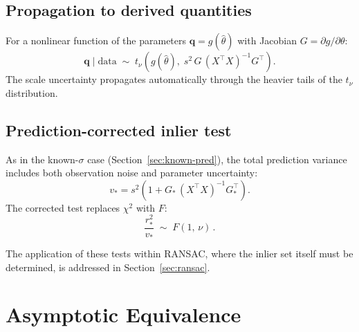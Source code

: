 \documentclass[11pt]{article}
\newcommand{\data}{\mathrm{data}}
\begin{document}
\subsection{Propagation to derived quantities}
\label{sec:unknown-prop}

For a nonlinear function of the parameters
$\mathbf{q} = g(\hat\theta)$ with Jacobian $G = \partial g / \partial \theta$:
\begin{equation}
  \boxed{
    \mathbf{q} \mid \data \;\sim\;
    t_\nu\!\left(g(\hat\theta),\;
      s^2\, G\, (X^\top X)^{-1} G^\top\right).
  }
\end{equation}
The scale uncertainty propagates automatically through the heavier tails of
the $t_\nu$ distribution.

\subsection{Prediction-corrected inlier test}
\label{sec:unknown-pred}

As in the known-$\sigma$ case (Section~\ref{sec:known-pred}), the
total prediction variance includes both observation noise and parameter
uncertainty:
\begin{equation}
  v_* = s^2 \left(1 + G_*\, (X^\top X)^{-1} G_*^\top\right).
\end{equation}
The corrected test replaces $\chi^2$ with $F$:
\begin{equation}
  \boxed{
    \frac{r_*^2}{v_*} \;\sim\; F(1,\, \nu)\,.
  }
\end{equation}

The application of these tests within RANSAC, where the inlier set
itself must be determined, is addressed in Section~\ref{sec:ransac}.

\section{Asymptotic Equivalence}
\label{sec:asymptotic}
\end{document}
